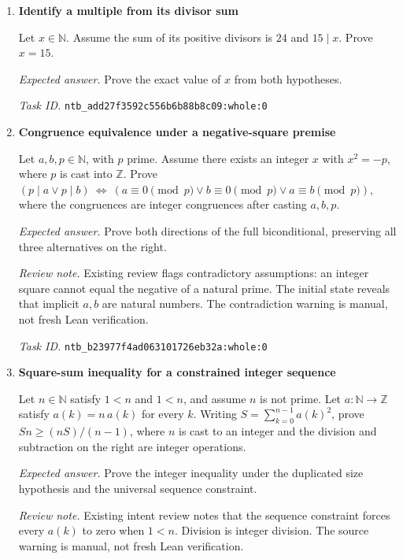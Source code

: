 \documentclass[11pt]{article}
\newcommand{\pth}[1]{\nolinkurl{#1}}
\begin{document}
\begin{enumerate}[label={TEST \arabic*.},leftmargin=4.5em,itemsep=1em]
\emph{Expected answer.} Prove the universal implication and both zero conclusions in $\mathbb Z/p\mathbb Z$.

\emph{Task ID.} \pth{ntb_a980417194ef95918cb0bf7d:whole:0}

\item \textbf{Identify a multiple from its divisor sum}\label{qn:test:58}

Let $x\in\mathbb N$. Assume the sum of its positive divisors is $24$ and $15\mid x$. Prove $x=15$.

\emph{Expected answer.} Prove the exact value of $x$ from both hypotheses.

\emph{Task ID.} \pth{ntb_add27f3592c556b6b88b8c09:whole:0}

\item \textbf{Congruence equivalence under a negative-square premise}\label{qn:test:59}

Let $a,b,p\in\mathbb N$, with $p$ prime. Assume there exists an integer $x$ with $x^2=-p$, where $p$ is cast into $\mathbb Z$. Prove $(p\mid a\lor p\mid b)\ \Longleftrightarrow\ (a\equiv0\pmod p\lor b\equiv0\pmod p\lor a\equiv b\pmod p)$, where the congruences are integer congruences after casting $a,b,p$.

\emph{Expected answer.} Prove both directions of the full biconditional, preserving all three alternatives on the right.

\emph{Review note.} Existing review flags contradictory assumptions: an integer square cannot equal the negative of a natural prime. The initial state reveals that implicit $a,b$ are natural numbers. The contradiction warning is manual, not fresh Lean verification.

\emph{Task ID.} \pth{ntb_b23977f4ad063101726eb32a:whole:0}

\item \textbf{Square-sum inequality for a constrained integer sequence}\label{qn:test:60}

Let $n\in\mathbb N$ satisfy $1<n$ and $1<n$, and assume $n$ is not prime. Let $a:\mathbb N\to\mathbb Z$ satisfy $a(k)=n\,a(k)$ for every $k$. Writing $S=\sum_{k=0}^{n-1}a(k)^2$, prove $Sn\ge(nS)/(n-1)$, where $n$ is cast to an integer and the division and subtraction on the right are integer operations.

\emph{Expected answer.} Prove the integer inequality under the duplicated size hypothesis and the universal sequence constraint.

\emph{Review note.} Existing intent review notes that the sequence constraint forces every $a(k)$ to zero when $1<n$. Division is integer division. The source warning is manual, not fresh Lean verification.


\end{enumerate}
\end{document}
